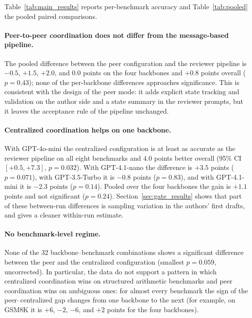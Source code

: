 \documentclass[lettersize,journal]{IEEEtran}
\begin{document}
Table~\ref{tab:main_results} reports per-benchmark accuracy and Table~\ref{tab:pooled} the pooled paired comparisons.

\paragraph{Peer-to-peer coordination does not differ from the message-based pipeline.}
The pooled difference between the peer configuration and the reviewer pipeline is \(-0.5\), \(+1.5\), \(+2.0\), and \(0.0\) points on the four backbones and \(+0.8\) points overall (\(p=0.43\)); none of the per-backbone differences approaches significance.
This is consistent with the design of the peer mode: it adds explicit state tracking and validation on the author side and a state summary in the reviewer prompts, but it leaves the acceptance rule of the pipeline unchanged.

\paragraph{Centralized coordination helps on one backbone.}
With GPT-4o-mini the centralized configuration is at least as accurate as the reviewer pipeline on all eight benchmarks and \(4.0\) points better overall (95\% CI \([+0.5,+7.3]\), \(p=0.032\)).
With GPT-4.1-nano the difference is \(+3.5\) points (\(p=0.071\)), with GPT-3.5-Turbo it is \(-0.8\) points (\(p=0.83\)), and with GPT-4.1-mini it is \(-2.3\) points (\(p=0.14\)).
Pooled over the four backbones the gain is \(+1.1\) points and not significant (\(p=0.24\)).
Section~\ref{sec:gate_results} shows that part of these between-run differences is sampling variation in the authors' first drafts, and gives a cleaner within-run estimate.

\paragraph{No benchmark-level regime.}
None of the 32 backbone--benchmark combinations shows a significant difference between the peer and the centralized configuration (smallest \(p=0.059\), uncorrected).
In particular, the data do not support a pattern in which centralized coordination wins on structured arithmetic benchmarks and peer coordination wins on ambiguous ones: for almost every benchmark the sign of the peer--centralized gap changes from one backbone to the next (for example, on GSM8K it is \(+6\), \(-2\), \(-6\), and \(+2\) points for the four backbones).
\end{document}
